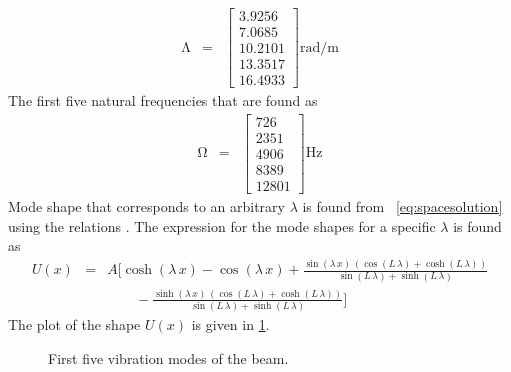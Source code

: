 \documentclass[]{report}
\begin{document}
\begin{eqnarray*}
\mathbf{\mathrm{\Lambda}}&=&\left[\begin{array}{c} 3.9256\\ 7.0685\\ 10.2101\\ 13.3517\\ 16.4933 \end{array}\right] \mathrm{rad/m}
\end{eqnarray*}
The first five natural frequencies that are found  as
\begin{eqnarray*}
\mathbf{\mathrm{\Omega}}&=&\left[\begin{array}{c} 726\\ 2351\\ 4906\\ 8389\\ 12801 \end{array}\right] \mathrm{Hz}
\end{eqnarray*}
Mode shape that corresponds to an arbitrary $\lambda$ is found from ~\cref{eq:spacesolution} using the relations . The expression for the mode shapes for a specific $\lambda$ is found as
\begin{eqnarray*}
U\left(x\right)&=& A\biggl[\cosh\!\left(\lambda\, x\right) - \cos\!\left(\lambda\, x\right) + \frac{\sin\!\left(\lambda\, x\right)\, \left(\cos\!\left(L\, \lambda\right) + \cosh\!\left(L\, \lambda\right)\right)}{\sin\!\left(L\, \lambda\right) + \sinh\!\left(L\, \lambda\right)} \\&& \quad \quad  - \frac{\sinh\!\left(\lambda\, x\right)\, \left(\cos\!\left(L\, \lambda\right) + \cosh\!\left(L\, \lambda\right)\right)}{\sin\!\left(L\, \lambda\right) + \sinh\!\left(L\, \lambda\right)}\biggr]
\end{eqnarray*}
The plot of the shape $U\left(x\right)$ is given in \cref{fig:cantileverallmodes}.
\begin{figure}[ht!]
\centering

\caption{First five vibration modes of the beam. }
\label{fig:cantileverallmodes}
\end{figure}




\end{document}
